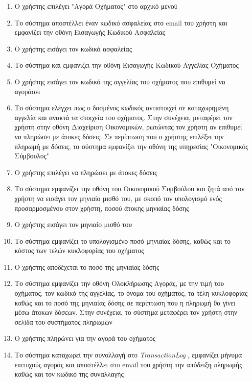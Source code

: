 \documentclass{../ol-softwaremanual}
\begin{document}
	\begin{enumerate}
		\item Ο χρήστης επιλέγει \en"\gr Αγορά Οχήματος\en" \gr στο αρχικό μενού
		\item Το σύστημα αποστέλλει έναν κωδικό ασφαλείας στο \en email \gr του χρήστη και εμφανίζει την οθόνη Εισαγωγής Κωδικού Ασφαλείας
		\item Ο χρήστης εισάγει τον κωδικό ασφαλείας		
		\item Το σύστημα  και εμφανίζει την οθόνη Εισαγωγής Κωδικού Αγγελίας Οχήματος
		\item Ο χρήστης εισάγει τον κωδικό της αγγελίας	του οχήματος που επιθυμεί να αγοράσει
		\item Το σύστημα ελέγχει πως ο δοσμένος κωδικός αντιστοιχεί σε καταχωρημένη αγγελία και ανακτά τα στοιχεία του οχήματος. Στην συνέχεια, μεταφέρει τον χρήστη στην οθόνη Διαχείριση Οικονομικών, ρωτώντας τον χρήστη αν επιθυμεί να πληρώσει με άτοκες δόσεις. Σε περίπτωση που ο χρήστης επιλέξει την πληρωμή με δόσεις, το σύστημα εμφανίζει την οθόνη της υπηρεσίας \en"\gr Οικονομικός Σύμβουλος\en"\gr
		\item Ο χρήστης επιλέγει να πληρώσει με άτοκες δόσεις
		\item Το σύστημα εμφανίζει την οθόνη του Οικονομικού Συμβούλου και ζητά από τον χρήστη να εισάγει τον μηνιαίο μισθό του, με σκοπό τον υπολογισμό ενός προσαρμοσμένου στον χρήστη, ποσού άτοκης μηνιαίας δόσης
		\item Ο χρήστης εισάγει τον μηνιαίο μισθό του
		\item Το σύστημα εμφανίζει το υπολογισμένο ποσό μηνιαίας δόσης, καθώς και το κόστος των τελών κυκλοφορίας του οχήματος
		\item Ο χρήστης αποδέχεται το ποσό της μηνιαίας δόσης
		\item Το σύστημα εμφανίζει την οθόνη Ολοκλήρωσης Αγοράς, με την τιμή του οχήματος, τον κωδικό της αγγελίας, το όνομα του οχήματος, τα τέλη κυκλοφορίας καθώς και το ποσό της μηνιαίας δόσης σε περίπτωση που η πληρωμή θα γίνει μέσω άτοκων δόσεων. Στην συνέχεια, το σύστημα μεταφέρει τον χρήστη στην σελίδα του συστήματος πληρωμών
		\item Ο χρήστης πληρώνει για την αγορά του οχήματος
		\item Το σύστημα καταχωρεί την συναλλαγή στο \en \textit{TransactionLog} \gr, εμφανίζει μήνυμα επιτυχούς αγοράς και αποστέλλει στο \en email \gr του χρήστη την απόδειξη πληρωμής καθώς και τον κωδικό της συναλλαγής
	\end{enumerate}
	
\end{document}
